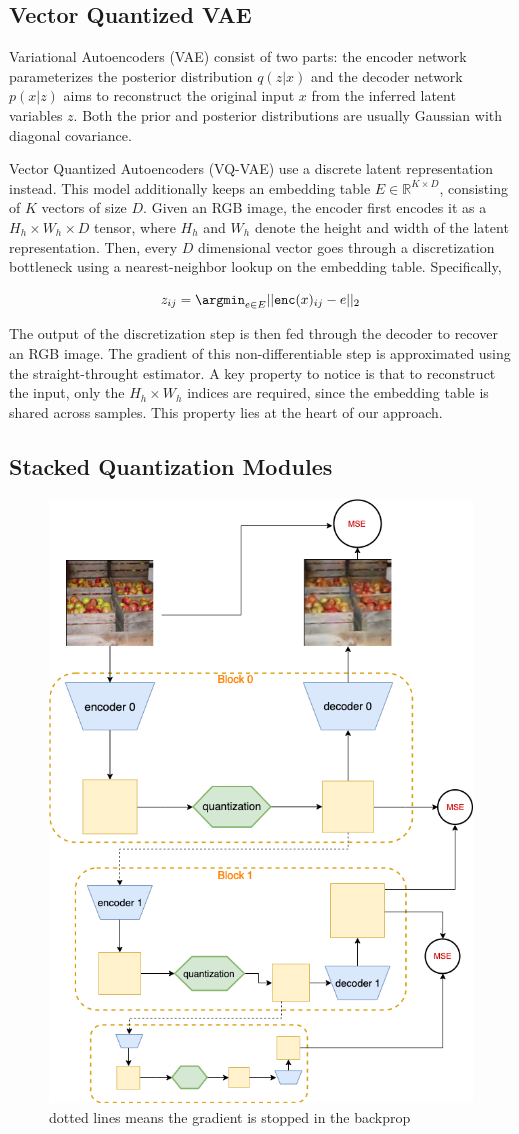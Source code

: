 \documentclass[colorinlistoftodos]{article} %
\begin{document}
\subsection{Vector Quantized VAE}
Variational Autoencoders (VAE) consist of two parts: the encoder network parameterizes the posterior distribution $q(z|x)$ and the decoder network $p(x|z)$ aims to reconstruct the original input $x$ from the inferred latent variables $z$. Both the prior and posterior distributions are usually Gaussian with diagonal covariance. 

Vector Quantized Autoencoders (VQ-VAE) use a discrete latent representation instead. This model additionally keeps an embedding table $E \in \mathbb{R}^{K \times D}$, consisting of $K$ vectors of size $D$. Given an RGB image, the encoder first encodes it as a $H_h \times W_h \times D$ tensor, where $H_h$ and $W_h$ denote the height and width of the latent representation. Then, every $D$ dimensional vector goes through a discretization bottleneck using a nearest-neighbor lookup on the embedding table. Specifically, 

\begin{equation*}
    z_{ij} = \argmin_{e \in E} || \texttt{enc}(x)_{ij} - e ||_2
\end{equation*} 

The output of the discretization step is then fed through the decoder to recover an RGB image. The gradient of this  non-differentiable step is approximated using the straight-throught estimator. A key property to notice is that to reconstruct the input, only the $H_h \times W_h$ indices are required, since the embedding table is shared across samples. This property lies at the heart of our approach. 

\subsection{Stacked Quantization Modules}
\begin{figure}
    \centering
    \includegraphics[width=0.6\linewidth]{figs/sqm_cartoon.png}
    \caption{dotted lines means the gradient is stopped in the backprop}
    \label{fig:soft_modules}
\end{figure}
\end{document}
